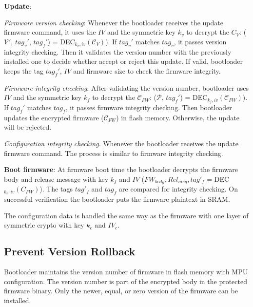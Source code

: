 \documentclass[11pt,oneside,onecolumn,letterpaper]{article}
\begin{document}
\textbf{Update}: 

\textit{Firmware version checking}:
Whenever the bootloader receives the update firmware command, it uses the $IV$ and the symmetric key $k_v$ to decrypt the $C_V$: ($\mathcal{V}'$, $tag_v'$, $tag_f'$) = DEC$_{k_v, iv}(\mathcal{C}_V)$).
If $tag_v'$ matches $tag_v$, it passes version integrity checking.
Then it validates the version number with the previously installed one to decide whether accept or reject this update.
If valid, bootloader keeps the tag $tag_f'$, $IV$ and firmware size to check the firmware integrity.

\textit{Firmware integrity checking}:
After validating the version number, bootloader uses $IV$ and the symmetric key $k_f$ to decrypt the $\mathcal{C}_{FW}$: ($\mathcal{P}$, $tag_f'$) = DEC$_{k_f, iv}(\mathcal{C}_{FW})$).
If $tag_f'$ matches $tag_f$, it passes firmware integrity checking.
Then bootloader updates the encrypted firmware ($\mathcal{C}_{FW}$) in flash memory.
Otherwise, the update will be rejected.

\textit{Configuration integrity checking}.
Whenever the bootloader receives the update firmware command.
The process is similar to firmware integrity checking.

\textbf{Boot firmware}: 
At firmware boot time the bootloader decrypts the firmware body and release message with key $k_f$ and $IV$ ($FW_{body}, Rel_{msg}, tag'_f$ = DEC$_{k_v, iv}(C_{FW})$).
The tags $tag'_f$ and $tag_f$ are compared for integrity checking.
On successful verification the bootloader puts the firmware plaintext in SRAM.

The configuration data is handled the same way as the firmware with one layer of symmetric crypto with key $k_c$ and $IV_c$.

\subsection{Prevent Version Rollback}
Bootloader maintains the version number of firmware in flash memory with MPU configuration.
The version number is part of the encrypted body in the protected firmware binary.
Only the newer, equal, or zero version of the firmware can be installed.
\end{document}
